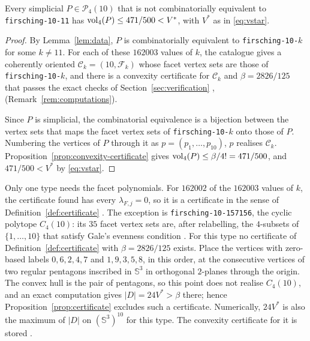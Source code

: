 \begin{proposition}
  \label{prop:rivals}
  Every simplicial $P \in \mathcal{P}_{4}(10)$ that is not combinatorially
  equivalent to \texttt{firsching-10-11} has
  $\operatorname{vol}_{4}(P) \leq 471/500 < V^{*}$, with $V^{*}$ as in \eqref{eq:vstar}.
\end{proposition}

\begin{proof}
  By Lemma~\ref{lem:data}, $P$ is combinatorially equivalent to
  \texttt{firsching-10-$k$} for some $k \neq 11$. For each of these $162003$
  values of $k$, the catalogue  gives a coherently oriented
  $\mathcal{C}_{k} = (10, \mathcal{F}_{k})$ whose facet vertex sets are those
  of \texttt{firsching-10-$k$}, and there is a convexity certificate for
  $\mathcal{C}_{k}$ and $\beta = 2826/125$ that passes the exact checks of
  Section~\ref{sec:verification} , 
  (Remark~\ref{rem:computations}).

  Since $P$ is simplicial, the combinatorial equivalence is a bijection
  between the vertex sets that maps the facet vertex sets of
  \texttt{firsching-10-$k$} onto those of $P$. Numbering the vertices of $P$
  through it as $p = (p_{1}, \ldots, p_{10})$, $p$ realises
  $\mathcal{C}_{k}$. Proposition~\ref{prop:convexity-certificate} gives
  $\operatorname{vol}_{4}(P) \leq \beta/4! = 471/500$, and $471/500 < V^{*}$ by
  \eqref{eq:vstar}.
\end{proof}

\begin{remark}
  \label{rem:cyclic}
  Only one type needs the facet polynomials. For $162002$ of the $162003$
  values of $k$, the certificate found has every $\lambda_{F,j} = 0$, so it
  is a certificate in the sense of Definition~\ref{def:certificate}
  . The exception is \texttt{firsching-10-157156}, the cyclic
  polytope $C_{4}(10)$: its $35$ facet vertex sets are, after relabelling,
  the $4$-subsets of $\{1, \ldots, 10\}$ that satisfy Gale's evenness
  condition \cite[Theorem~0.7]{ziegler-1995}. For this type no certificate
  of Definition~\ref{def:certificate} with $\beta = 2826/125$ exists. Place
  the vertices with zero-based labels $0, 6, 2, 4, 7$ and $1, 9, 3, 5, 8$, in
  this order, at the consecutive vertices of two regular pentagons inscribed
  in $\mathbb{S}^{3}$ in orthogonal $2$-planes through the origin. The convex
  hull is the pair of pentagons, so this point does not realise $C_{4}(10)$,
  and an exact computation gives $|D| = 24 V^{*} > \beta$ there; hence
  Proposition~\ref{prop:certificate} excludes such a certificate. Numerically, $24 V^{*}$ is also the maximum of
  $|D|$ on $(\mathbb{S}^{3})^{10}$ for this type. The convexity certificate
  for it is stored .
\end{remark}

